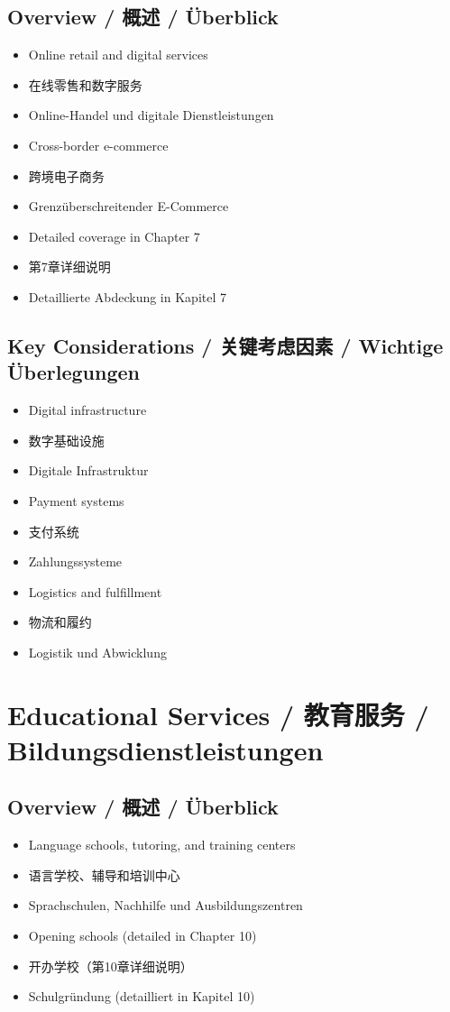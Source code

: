 \subsection{Overview / 概述 / Überblick}
\begin{itemize}
    \item Online retail and digital services
    \item 在线零售和数字服务
    \item Online-Handel und digitale Dienstleistungen
    \item Cross-border e-commerce
    \item 跨境电子商务
    \item Grenzüberschreitender E-Commerce
    \item Detailed coverage in Chapter 7
    \item 第7章详细说明
    \item Detaillierte Abdeckung in Kapitel 7
\end{itemize}

\subsection{Key Considerations / 关键考虑因素 / Wichtige Überlegungen}
\begin{itemize}
    \item Digital infrastructure
    \item 数字基础设施
    \item Digitale Infrastruktur
    \item Payment systems
    \item 支付系统
    \item Zahlungssysteme
    \item Logistics and fulfillment
    \item 物流和履约
    \item Logistik und Abwicklung
\end{itemize}

\section{Educational Services / 教育服务 / Bildungsdienstleistungen}

\subsection{Overview / 概述 / Überblick}
\begin{itemize}
    \item Language schools, tutoring, and training centers
    \item 语言学校、辅导和培训中心
    \item Sprachschulen, Nachhilfe und Ausbildungszentren
    \item Opening schools (detailed in Chapter 10)
    \item 开办学校（第10章详细说明）
    \item Schulgründung (detailliert in Kapitel 10)
\end{itemize}

